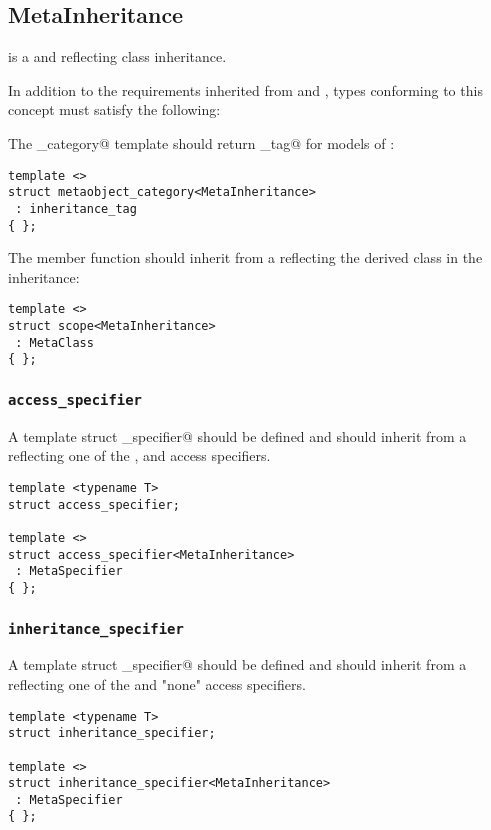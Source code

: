 \subsection{MetaInheritance}
\label{concept-MetaInheritance}

 is a  and  reflecting class inheritance.

In addition to the requirements inherited from  and ,
types conforming to this concept must satisfy the following:

The \verb@metaobject_category@ template should return \verb@inheritance_tag@ for models
of :

\begin{verbatim}
template <>
struct metaobject_category<MetaInheritance>
 : inheritance_tag
{ };
\end{verbatim}

The \verb@scope@ member function should inherit from a  reflecting
the derived class in the inheritance:

\begin{verbatim}
template <>
struct scope<MetaInheritance>
 : MetaClass
{ };
\end{verbatim}

\subsubsection{\texttt{access\_specifier}}

A template struct \verb@access_specifier@ should be defined and should inherit from
a  reflecting one of the \verb@private@, \verb@protected@ and
\verb@public@ access specifiers.

\begin{verbatim}
template <typename T>
struct access_specifier;

template <>
struct access_specifier<MetaInheritance>
 : MetaSpecifier
{ };
\end{verbatim}

\subsubsection{\texttt{inheritance\_specifier}}

A template struct \verb@inheritance_specifier@ should be defined and should inherit from
a  reflecting one of the \verb@virtual@ and "none" access specifiers.

\begin{verbatim}
template <typename T>
struct inheritance_specifier;

template <>
struct inheritance_specifier<MetaInheritance>
 : MetaSpecifier
{ };
\end{verbatim}

